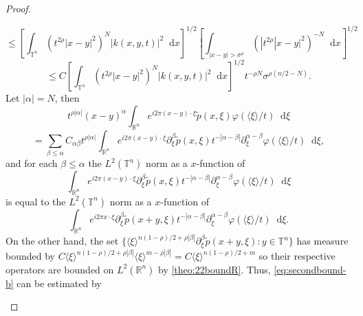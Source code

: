 \documentclass[12pt, reqno]{amsart}
\theoremstyle{definition}
\theoremstyle{remark}
\numberwithin{equation}{section}
\newcommand*\diff{\mathop{}\!\mathrm{d}}
\begin{document}
\begin{proof}
\begin{itemize}
\begin{equation*}
        \end{equation*}
        \begin{equation*}
            \leq \left[ \int_{\mathbb{T}^n} \left( t^{2\rho} |x-y|^2 \right)^N |k(x, y, t)|^2 \diff x \right]^{1/2} \left[ \int_{|x-y|>\sigma^\rho} \left(|t^{2\rho}|x-y|^2\right)^{-N}\diff x \right]^{1/2}
        \end{equation*}
        \begin{equation}
            \leq C \left[ \int_{\mathbb{T}^n} \left( t^{2\rho}|x-y|^2 \right)^N|k(x,y,t)|^2 \diff x \right]^{1/2}t^{-\rho N}\sigma^{\rho(n/2 - N)}.
            \label{eq:secondbound-b}
        \end{equation} 
        Let $|\alpha|=N$, then 
        \begin{equation*}
            t^{\rho|\alpha|} (x-y)^\alpha \int_{\mathbb{R}^n} e^{i2\pi(x - y) \cdot \xi} \tilde{p}(x, \xi)\varphi(\langle\xi\rangle/t)\diff\xi 
        \end{equation*}
        \begin{equation*}
            = \sum_{\beta\leq\alpha} C_{\alpha\beta}t^{\rho|\alpha|} \int_{\mathbb{R}^n} e^{i2\pi(x - y) \cdot \xi} \partial^\beta_\xi \tilde{p}(x, \xi)t^{-|\alpha-\beta|} \partial^{\alpha-\beta}_\xi \varphi(\langle\xi\rangle/t)\diff \xi,
        \end{equation*}
        and for each $\beta\leq\alpha$ the $L^2(\mathbb{T}^n)$ norm as a $x$-function of 
        \begin{equation*}
            \int_{\mathbb{R}^n} e^{i2\pi(x - y) \cdot \xi} \partial^\beta_\xi \tilde{p}(x, \xi)t^{-|\alpha-\beta|} \partial^{\alpha-\beta}_\xi \varphi(\langle\xi\rangle/t)\diff \xi
        \end{equation*}
        is equal to the $L^2(\mathbb{T}^n)$ norm as a $x$-function of 
        \begin{equation*}
            \int_{\mathbb{R}^n} e^{i2\pi x \cdot \xi} \partial^\beta_\xi \tilde{p}(x+y, \xi)t^{-|\alpha-\beta|} \partial^{\alpha-\beta}_\xi \varphi(\langle\xi\rangle/t)\diff \xi.
        \end{equation*}
        On the other hand, the set $\{ \langle\xi\rangle^{n(1-\rho)/2 + \rho|\beta|} \partial^\beta_\xi\tilde{p}(x + y, \xi) : y \in \mathbb{T}^n  \}$ has measure bounded by $C\langle\xi\rangle^{n(1-\rho)/2 + \rho|\beta|} \langle\xi\rangle^{m- \rho|\beta|} = C\langle\xi\rangle^{n(1-\rho)/2 +m}   $ so their respective operators are bounded on $L^2(\mathbb{R}^n)$ by \cref{theo:22boundR}. Thus, \cref{eq:secondbound-b} can be estimated by  


\end{itemize}
\end{proof}
\end{document}
